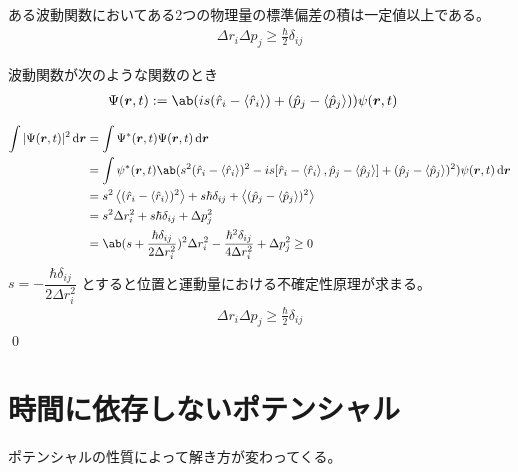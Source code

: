 \documentclass[uplatex,dvipdfmx,a4paper,11pt]{jlreq}
\makeatletter
\newcommand{\rr}{\bm{r}}
\numberwithin{equation}{section}
\theoremstyle{definition}
\renewenvironment{proof}[1][\proofname]{\par
  \normalfont
  \topsep6\p@\@plus6\p@ \trivlist
  \item[\hskip\labelsep{\bfseries #1}\@addpunct{\bfseries}]\ignorespaces\quad\par
}{%
  \qed\endtrivlist\@endpefalse
}
\renewcommand\proofname{証明}
\makeatother
\begin{document}
\begin{theorem}[不確定性原理]
  ある波動関数においてある2つの物理量の標準偏差の積は一定値以上である。
  \begin{align}
    \Delta r_i\Delta p_j \geq \frac{\hbar}{2}\delta_{ij}
  \end{align}
\end{theorem}
\begin{proof}
  波動関数が次のような関数のとき
  \begin{align}
    \Psi(\rr, t) & := \ab(is(\hat{r}_i - \ev{\hat{r}_i}) + (\hat{p}_j - \ev{\hat{p}_j}))\psi(\rr, t)
  \end{align}

  \begin{align}
    \int|\Psi(\rr, t)|^2\dl{\rr} & = \int\Psi^*(\rr, t)\Psi(\rr, t)\dl{\rr}                                                                                                                                     \\
                                 & = \int\psi^*(\rr, t)\ab(s^2(\hat{r}_i - \ev{\hat{r}_i})^2 - is[\hat{r}_i - \ev{\hat{r}_i}, \hat{p}_j - \ev{\hat{p}_j}] + (\hat{p}_j - \ev{\hat{p}_j})^2)\psi(\rr, t)\dl{\rr} \\
                                 & = s^2\ev{(\hat{r}_i - \ev{\hat{r}_i})^2} + s\hbar\delta_{ij} + \ev{(\hat{p}_j - \ev{\hat{p}_j})^2}                                                                           \\
                                 & = s^2\Delta r_i^2 + s\hbar\delta_{ij} + \Delta p_j^2                                                                                                                         \\
                                 & = \ab(s + \frac{\hbar\delta_{ij}}{2\Delta r_i^2})^2\Delta r_i^2 - \frac{\hbar^2\delta_{ij}}{4\Delta r_i^2} + \Delta p_j^2 \geq 0
  \end{align}
  $s = -\dfrac{\hbar\delta_{ij}}{2\Delta r_i^2}$ とすると位置と運動量における不確定性原理が求まる。
  \begin{align}
    \Delta r_i\Delta p_j \geq \frac{\hbar}{2}\delta_{ij}
  \end{align}
\end{proof}



\section{時間に依存しないポテンシャル}
ポテンシャルの性質によって解き方が変わってくる。
\end{document}
